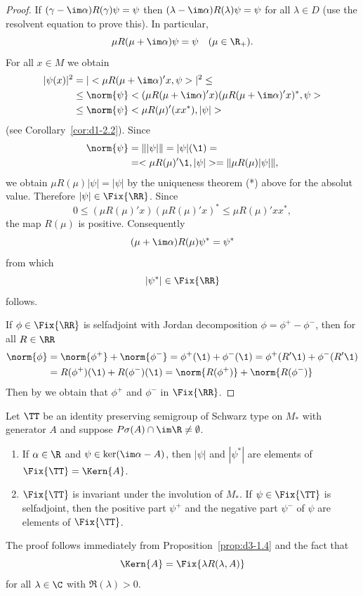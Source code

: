 \begin{proof}
If\/ $(\gamma - \im\alpha)R(\gamma)\psi = \psi$ then $(\lambda - \im\alpha)R(\lambda)\psi = \psi$ for all $\lambda \in D$ (use the resolvent equation to prove this).
In particular, 
\[
\mu R(\mu + \im\alpha)\psi = \psi \quad (\mu \in \R_{+}).
\]
For all $x \in M$ we obtain
\begin{align*}
|\psi(x)|^2 &= |<\mu R(\mu+\im\alpha)'x,\psi>|^2 \leq \\
&\leq \norm{\psi} <(\mu R(\mu+\im\alpha)'x)(\mu R(\mu+\im\alpha)'x)^{*},\psi>  \\
&\leq \norm{\psi} <\mu R(\mu)'(xx^{*}),|\psi|>
\end{align*}
(see Corollary~\ref{cor:d1-2.2}).
Since
\begin{align*}
\norm{\psi} &= \| |\psi| \| = |\psi|(\1) = \\
&= <\mu R(\mu)'\1,|\psi|> = \| \mu R(\mu)|\psi| \|,
\end{align*}
we obtain $\mu R(\mu)|\psi| = |\psi|$ by the uniqueness 
theorem (*) above for the absolut value.
Therefore $|\psi| \in \Fix{\RR} $.
Since
\[
0 \leq (\mu R(\mu)'x)(\mu R(\mu)'x)^{*} \leq \mu R(\mu)'xx^{*},
\]
the map $R(\mu)$ is positive.
Consequently 
\[
(\mu+\im\alpha)R(\mu)\psi^{*} = \psi^{*}
\]
from which 
\[
|\psi^{*}| \in \Fix{\RR} 
\]
follows.

If\/ $\phi \in \Fix{\RR} $ is selfadjoint with Jordan decomposition $\phi = \phi^{+} - \phi^{-}$, then for all $ R \in \RR $
\begin{align*}
\norm{ \phi } &= \norm{ \phi^{+} } + \norm{ \phi^{-} }  =
    \phi^{+}(\1) + \phi^{-}(\1) = \phi^{+}(R'\1) + \phi^{-}(R'\1) \\
    &= R(\phi^{+})(\1) + R(\phi^{-})(\1)  =
    \norm{ R(\phi^{+}) } + \norm{ R(\phi^{-}) } 
\end{align*}
Then by \textcite[Theorem III.4.2.]{takesaki:1979} we obtain that $\phi^{+}$ and $\phi^{-}$ in $ \Fix{\RR} $.
\end{proof}
\begin{corollary}\label{cor:d3-1.5}
Let $\TT$ be an identity preserving semigroup of Schwarz type on $M_{*}$ with generator $A$ and suppose $P\sigma(A) \cap \im\R \neq \emptyset$.
\begin{enumerate}[\upshape (i)]
\item
If\/ $\alpha \in \R$ and $\psi \in \operatorname{ker}(\im\alpha - A)$, then $|\psi|$ and $|\psi^{*}|$ are elements of\/ $\Fix{\TT} = \Kern{A}$.

\item 
$\Fix{\TT}$ is invariant under the involution of\/ $M_{*}$.
If\/ $\psi \in \Fix{\TT}$ is selfadjoint, then the positive part $\psi^{+}$ and the negative part $\psi^{-}$ of\/ $\psi$ are elements of\/ $\Fix{\TT}$.
\end{enumerate}

\end{corollary}
The proof follows immediately from Proposition~\ref{prop:d3-1.4} and the fact that 
\[ 
\Kern{A} = \Fix{\lambda R(\lambda,A)}
\]
for all $\lambda \in \C$ with $\Re(\lambda) > 0$.

